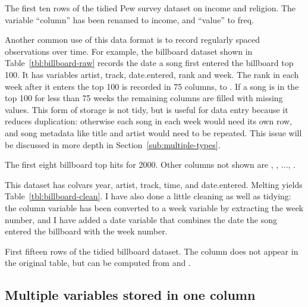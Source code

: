 \documentclass[article]{jss}
\begin{document}
\begin{table}[htbp]
  \centering
  
  \caption{The first ten rows of the tidied Pew survey dataset on income and religion. The variable ``column'' has been renamed to income, and ``value'' to freq.}
  \label{tbl:pew-clean}
\end{table}

Another common use of this data format is to record regularly spaced observations over time. For example, the billboard dataset shown in Table~\ref{tbl:billboard-raw} records the date a song first entered the billboard top 100. It has variables artist, track, date.entered, rank and week. The rank in each week after it enters the top 100 is recorded in 75 columns,  to . If a song is in the top 100 for less than 75 weeks the remaining columns are filled with missing values.  This form of storage is not tidy, but is useful for data entry because it reduces duplication: otherwise each song in each week would need its own row, and song metadata like title and artist would need to be repeated. This issue will be discussed in more depth in Section~\ref{sub:multiple-types}.

\begin{table}[htbp]
  \centering
  
  \caption{The first eight billboard top hits for 2000. Other columns not shown are , , ..., .}
  \label{tbl:billboard-raw}
\end{table}

This dataset has colvars year, artist, track, time, and date.entered. Melting yields Table~\ref{tbl:billboard-clean}. I have also done a little cleaning as well as tidying: the column variable has been converted to a week variable by extracting the week number, and I have added a date variable that combines the date the song entered the billboard with the week number.

\begin{table}[htbp]
  \centering
  
  \caption{First fifteen rows of the tidied billboard dataset. The  column does not appear in the original table, but can be computed from  and .}
  \label{tbl:billboard-clean}
\end{table}

\subsection{Multiple variables stored in one column}
\end{document}
